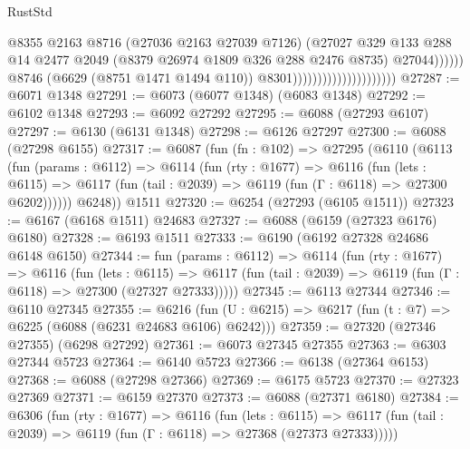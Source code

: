 \begin{lexlean}{RustStd}
\begin{coremodule}
                                                        @8355
                                                        @2163
                                                        @8716
                                                        (@27036 @2163 @27039 @7126)
                                                        (@27027
                                                          @329
                                                          @133
                                                          @288
                                                          @14
                                                          @2477
                                                          @2049
                                                          (@8379 @26974 @1809 @326 @288 @2476 @8735)
                                                          @27044))))))
                                              @8746
                                              (@6629 (@8751 @1471 @1494 @110))
                                              @8301)))))))))))))))))))))
@27287 := @6071 @1348
@27291 := @6073 (@6077 @1348) (@6083 @1348)
@27292 := @6102 @1348
@27293 := @6092 @27292
@27295 := @6088 (@27293 @6107)
@27297 := @6130 (@6131 @1348)
@27298 := @6126 @27297
@27300 := @6088 (@27298 @6155)
@27317 := @6087
    (fun (fn : @102) =>
    @27295
      (@6110
        (@6113
          (fun (params : @6112) =>
          @6114
            (fun (rty : @1677) =>
            @6116
              (fun (lets : @6115) =>
              @6117 (fun (tail : @2039) => @6119 (fun (Γ : @6118) => @27300 @6202))))))
        @6248))
    @1511
@27320 := @6254 (@27293 (@6105 @1511))
@27323 := @6167 (@6168 @1511) @24683
@27327 := @6088 (@6159 (@27323 @6176) @6180)
@27328 := @6193 @1511
@27333 := @6190 (@6192 @27328 @24686 @6148 @6150)
@27344 := fun (params : @6112) =>
  @6114
    (fun (rty : @1677) =>
    @6116
      (fun (lets : @6115) =>
      @6117 (fun (tail : @2039) => @6119 (fun (Γ : @6118) => @27300 (@27327 @27333)))))
@27345 := @6113 @27344
@27346 := @6110 @27345
@27355 := @6216
    (fun (U : @6215) => @6217 (fun (t : @7) => @6225 (@6088 (@6231 @24683 @6106) @6242)))
@27359 := @27320 (@27346 @27355) (@6298 @27292)
@27361 := @6073 @27345 @27355
@27363 := @6303 @27344 @5723
@27364 := @6140 @5723
@27366 := @6138 (@27364 @6153)
@27368 := @6088 (@27298 @27366)
@27369 := @6175 @5723
@27370 := @27323 @27369
@27371 := @6159 @27370
@27373 := @6088 (@27371 @6180)
@27384 := @6306
    (fun (rty : @1677) =>
    @6116
      (fun (lets : @6115) =>
      @6117 (fun (tail : @2039) => @6119 (fun (Γ : @6118) => @27368 (@27373 @27333)))))

\end{coremodule}
\end{lexlean}
